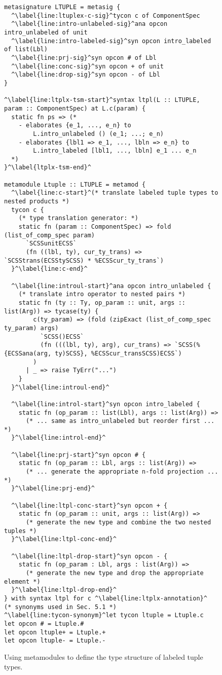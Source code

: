 \begin{figure}[p!]
\vspace{-25px}
\begin{lstlisting}
metasignature LTUPLE = metasig {
  ^\label{line:ltuplex-c-sig}^tycon c of ComponentSpec
  ^\label{line:intro-unlabeled-sig}^ana opcon intro_unlabeled of unit
  ^\label{line:intro-labeled-sig}^syn opcon intro_labeled of list(Lbl)
  ^\label{line:prj-sig}^syn opcon # of Lbl
  ^\label{line:conc-sig}^syn opcon + of unit
  ^\label{line:drop-sig}^syn opcon - of Lbl
}

^\label{line:ltplx-tsm-start}^syntax ltpl(L :: LTUPLE, param :: ComponentSpec) at L.c(param) {
  static fn ps => (* 
    - elaborates {e_1, ..., e_n} to 
        L.intro_unlabeled () (e_1; ...; e_n)
    - elaborates {lbl1 => e_1, ..., lbln => e_n} to 
        L.intro_labeled [lbl1, ..., lbln] e_1 ... e_n
  *)
}^\label{ltplx-tsm-end}^

metamodule Ltuple :: LTUPLE = metamod {
  ^\label{line:c-start}^(* translate labeled tuple types to nested products *)
  tycon c {
  	(* type translation generator: *)
  	static fn (param :: ComponentSpec) => fold (list_of_comp_spec param)
      `SCSSunitECSS`
      (fn ((lbl, ty), cur_ty_trans) => `SCSStrans(ECSStySCSS) * %ECSScur_ty_trans`)
  }^\label{line:c-end}^

  ^\label{line:introul-start}^ana opcon intro_unlabeled {
  	(* translate intro operator to nested pairs *)
  	static fn (ty :: Ty, op_param :: unit, args :: list(Arg)) => tycase(ty) {
        c(ty_param) => (fold (zipExact (list_of_comp_spec ty_param) args)
      	  `SCSS()ECSS`
          (fn (((lbl, ty), arg), cur_trans) => `SCSS(%{ECSSana(arg, ty)SCSS}, %ECSScur_transSCSS)ECSS`)
        )
      | _ => raise TyErr("...")
    }
  }^\label{line:introul-end}^

  ^\label{line:introl-start}^syn opcon intro_labeled {
  	static fn (op_param :: list(Lbl), args :: list(Arg)) => 
      (* ... same as intro_unlabeled but reorder first ... *)
  }^\label{line:introl-end}^

  ^\label{line:prj-start}^syn opcon # {
  	static fn (op_param :: Lbl, args :: list(Arg)) =>  
      (* ... generate the appropriate n-fold projection ... *)
  }^\label{line:prj-end}^

  ^\label{line:ltpl-conc-start}^syn opcon + {
  	static fn (op_param :: unit, args :: list(Arg)) => 
      (* generate the new type and combine the two nested tuples *)
  }^\label{line:ltpl-conc-end}^

  ^\label{line:ltpl-drop-start}^syn opcon - {
  	static fn (op_param : Lbl, args : list(Arg)) => 
      (* generate the new type and drop the appropriate element *)
  }^\label{line:ltpl-drop-end}^
} with syntax ltpl for c ^\label{line:ltplx-annotation}^
(* synonyms used in Sec. 5.1 *)
^\label{line:tycon-synonym}^let tycon ltuple = Ltuple.c
let opcon # = Ltuple.#
let opcon ltuple+ = Ltuple.+ 
let opcon ltuple- = Ltuple.-
\end{lstlisting}
\caption{Using metamodules to define the type structure of labeled tuple types.}
\label{fig:ltuplex}
\end{figure}